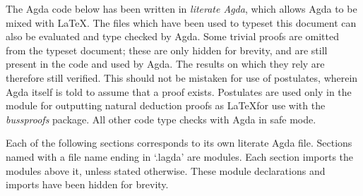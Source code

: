 
The Agda code below has been written in \emph{literate Agda}, which allows Agda
to be mixed with \LaTeX. The files which have been used to typeset this document
can also be evaluated and type checked by Agda. Some trivial proofs are omitted
from the typeset document; these are only hidden for brevity, and are still
present in the code and used by Agda. The results on which they rely are
therefore still verified. This should not be mistaken for use of postulates,
wherein Agda itself is told to assume that a proof exists. Postulates are used
only in the module for outputting natural deduction proofs as \LaTeX for use
with the \emph{bussproofs} package. All other code type checks with Agda in safe
mode.

Each of the following sections corresponds to its own literate Agda file.
Sections named with a file name ending in `.lagda' are modules. Each section
imports the modules above it, unless stated otherwise. These module declarations
and imports have been hidden for brevity.

